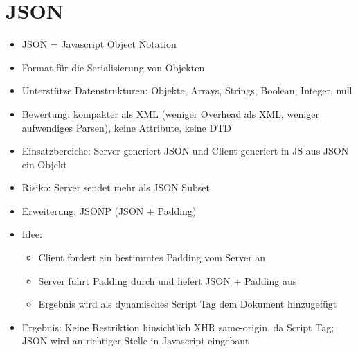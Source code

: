 \documentclass{article} %
\begin{document}
	\section{JSON}
	\begin{itemize}
		\item JSON = Javascript Object Notation
		\item Format für die Serialisierung von Objekten
		\item Unterstütze Datenstrukturen: Objekte, Arrays, Strings, Boolean, Integer, null
		\item Bewertung: kompakter als XML (weniger Overhead als XML, weniger aufwendiges Parsen), keine Attribute, keine DTD
		\item Einsatzbereiche: Server generiert JSON und Client generiert in JS aus JSON ein Objekt
		\item Risiko: Server sendet mehr als JSON Subset
		\item Erweiterung: JSONP (JSON + Padding)
		\item Idee: 
		\begin{itemize}
			\item Client fordert ein bestimmtes Padding vom Server an
			\item Server führt Padding durch und liefert JSON + Padding aus
			\item Ergebnis wird als dynamisches Script Tag dem Dokument hinzugefügt
		\end{itemize}
		\item Ergebnis: Keine Restriktion hinsichtlich XHR same-origin, da Script Tag; JSON wird an richtiger Stelle in Javascript eingebaut
	\end{itemize}
\end{document}
